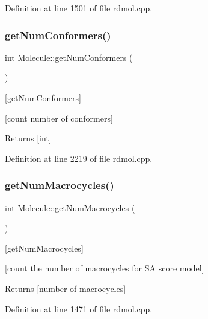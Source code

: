 Definition at line 1501 of file rdmol.\+cpp.

\mbox{\label{class_molecule_a00c23cd635ca82207165e59cdd714d99}} 
\subsubsection{\texorpdfstring{get\+Num\+Conformers()}{getNumConformers()}}
{\footnotesize\ttfamily int Molecule\+::get\+Num\+Conformers (\begin{DoxyParamCaption}{ }\end{DoxyParamCaption})}



\mbox{[}get\+Num\+Conformers\mbox{]} 

\mbox{[}count number of conformers\mbox{]} \begin{DoxyReturn}{Returns}
\mbox{[}int\mbox{]} 
\end{DoxyReturn}


Definition at line 2219 of file rdmol.\+cpp.

\mbox{\label{class_molecule_a7ae4c6e9458d7874bf43bdfbe079d875}} 
\subsubsection{\texorpdfstring{get\+Num\+Macrocycles()}{getNumMacrocycles()}}
{\footnotesize\ttfamily int Molecule\+::get\+Num\+Macrocycles (\begin{DoxyParamCaption}{ }\end{DoxyParamCaption})}



\mbox{[}get\+Num\+Macrocycles\mbox{]} 

\mbox{[}count the number of macrocycles for SA score model\mbox{]} \begin{DoxyReturn}{Returns}
\mbox{[}number of macrocycles\mbox{]} 
\end{DoxyReturn}


Definition at line 1471 of file rdmol.\+cpp.

\mbox{\label{class_molecule_ab418ce9c2222f00552c847a14499e282}} 
